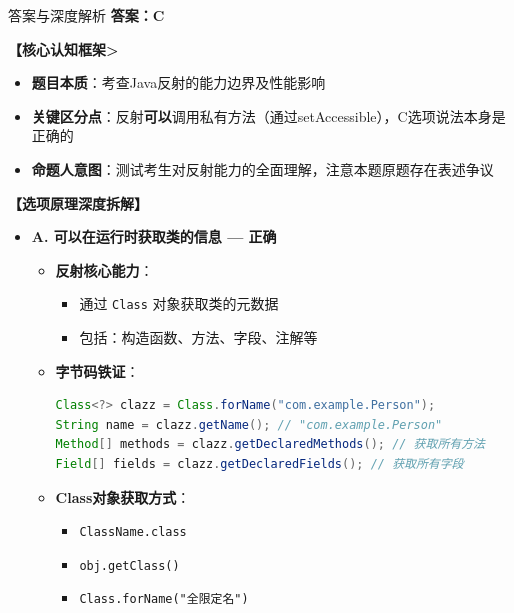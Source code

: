 \documentclass[12pt, a4paper]{ctexart}
\begin{document}
\begin{bluebox}{答案与深度解析}
	\textbf{答案：C}

	\textbf{【核心认知框架>}
	\begin{itemize}[label={}, leftmargin=*, nosep]
		\item \textbf{题目本质}：考查Java反射的能力边界及性能影响
		\item \textbf{关键区分点}：反射\textbf{可以}调用私有方法（通过setAccessible），C选项说法本身是正确的
		\item \textbf{命题人意图}：测试考生对反射能力的全面理解，注意本题原题存在表述争议
	\end{itemize}

	\textbf{【选项原理深度拆解】}
	\begin{itemize}[label={}, leftmargin=*, nosep]

		\item \textbf{A. 可以在运行时获取类的信息 — 正确}
		      \begin{itemize}[label={}, leftmargin=*, nosep]
			      \item \textbf{反射核心能力}：
			            \begin{itemize}[label={}, nosep]
				            \item 通过 \texttt{Class} 对象获取类的元数据
				            \item 包括：构造函数、方法、字段、注解等
			            \end{itemize}

			      \item \textbf{字节码铁证}：
			            \begin{lstlisting}[language=Java]
Class<?> clazz = Class.forName("com.example.Person");
String name = clazz.getName(); // "com.example.Person"
Method[] methods = clazz.getDeclaredMethods(); // 获取所有方法
Field[] fields = clazz.getDeclaredFields(); // 获取所有字段
      \end{lstlisting}

			      \item \textbf{Class对象获取方式}：
			            \begin{itemize}[label={}, nosep]
				            \item \texttt{ClassName.class}
				            \item \texttt{obj.getClass()}
				            \item \texttt{Class.forName("全限定名")}
			            \end{itemize}


\end{itemize}
\end{itemize}
\end{bluebox}
\end{document}
